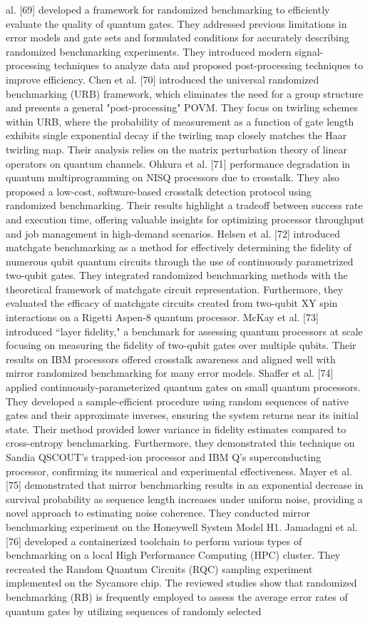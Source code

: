 al. [69] developed a framework for randomized benchmarking to efficiently evaluate the quality of quantum gates. They addressed previous limitations in error models and gate sets and formulated conditions for accurately describing randomized benchmarking experiments. They introduced modern signal-processing techniques to analyze data and proposed post-processing techniques to improve efficiency. Chen et al. [70] introduced the universal randomized benchmarking (URB) framework, which eliminates the need for a group structure and presents a general "post-processing" POVM. They focus on twirling schemes within URB, where the probability of measurement as a function of gate length exhibits single exponential decay if the twirling map closely matches the Haar twirling map. Their analysis relies on the matrix perturbation theory of linear operators on quantum channels. Ohkura et al. [71] performance degradation in quantum multiprogramming on NISQ processors due to crosstalk. They also proposed a low-cost, software-based crosstalk detection protocol using randomized benchmarking. Their results highlight a tradeoff between success rate and execution time, offering valuable insights for optimizing processor throughput and job management in high-demand scenarios. Helsen et al. [72] introduced matchgate benchmarking as a method for effectively determining the fidelity of numerous qubit quantum circuits through the use of continuously parametrized two-qubit gates. They integrated randomized benchmarking methods with the theoretical framework of matchgate circuit representation. Furthermore, they evaluated the efficacy of matchgate circuits created from two-qubit XY spin interactions on a Rigetti Aspen-8 quantum processor. McKay et al. [73] introduced “layer fidelity," a benchmark for assessing quantum processors at scale focusing on measuring the fidelity of two-qubit gates over multiple qubits. Their results on IBM processors offered crosstalk awareness and aligned well with mirror randomized benchmarking for many error models. Shaffer et al. [74] applied continuously-parameterized quantum gates on small quantum processors. They developed a sample-efficient procedure using random sequences of native gates and their approximate inverses, ensuring the system returns near its initial state. Their method provided lower variance in fidelity estimates compared to cross-entropy benchmarking. Furthermore, they demonstrated this technique on Sandia QSCOUT’s trapped-ion processor and IBM Q’s superconducting processor, confirming its numerical and experimental effectiveness. Mayer et al. [75] demonstrated that mirror benchmarking results in an exponential decrease in survival probability as sequence length increases under uniform noise, providing a novel approach to estimating noise coherence. They conducted mirror benchmarking experiment on the Honeywell System Model H1. Jamadagni et al. [76] developed a containerized toolchain to perform various types of benchmarking on a local High Performance Computing (HPC) cluster. They recreated the Random Quantum Circuits (RQC) sampling experiment implemented on the Sycamore chip. The reviewed studies show that randomized benchmarking (RB) is frequently employed to assess the average error rates of quantum gates by utilizing sequences of randomly selected 